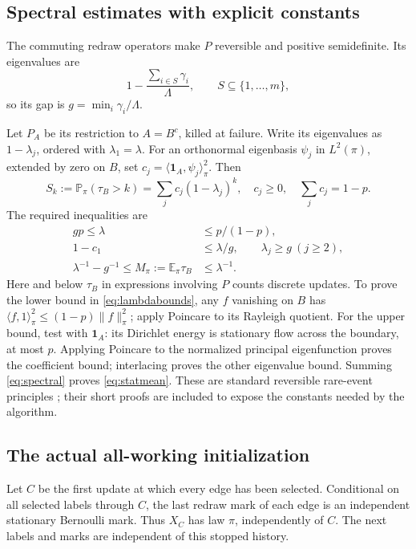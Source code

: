 \documentclass[11pt,a4paper]{article}
\newcommand{\E}{\mathbb E}
\newcommand{\Pp}{\mathbb P}
\newcommand{\one}{\mathbf 1}
\begin{document}
\subsection{Spectral estimates with explicit constants}
The commuting redraw operators make $P$ reversible and positive semidefinite. Its eigenvalues are
\[
 1-\frac{\sum_{i\in S}\gamma_i}{\Lambda},\qquad S\subseteq\{1,\ldots,m\},
\]
so its gap is $g=\min_i\gamma_i/\Lambda$.

Let $P_A$ be its restriction to $A=B^c$, killed at failure. Write its eigenvalues as $1-\lambda_j$, ordered with $\lambda_1=\lambda$. For an orthonormal eigenbasis $\psi_j$ in $L^2(\pi)$, extended by zero on $B$, set $c_j=\langle\one_A,\psi_j\rangle_\pi^2$. Then
\begin{equation}
 S_k:=\Pp_\pi(\tau_B>k)=\sum_jc_j(1-\lambda_j)^k,
 \quad c_j\ge0,\quad \sum_jc_j=1-p.\label{eq:spectral}
\end{equation}
The required inequalities are
\begin{align}
 gp\le\lambda&\le p/(1-p),\label{eq:lambdabounds}\\
 1-c_1&\le\lambda/g,\qquad \lambda_j\ge g\ (j\ge2),\label{eq:weights}\\
 \lambda^{-1}-g^{-1}\le M_\pi:=\E_\pi\tau_B&\le\lambda^{-1}.\label{eq:statmean}
\end{align}
Here and below $\tau_B$ in expressions involving $P$ counts discrete updates. To prove the lower bound in \eqref{eq:lambdabounds}, any $f$ vanishing on $B$ has $\langle f,1\rangle_\pi^2\le(1-p)\|f\|_\pi^2$; apply Poincare to its Rayleigh quotient. For the upper bound, test with $\one_A$: its Dirichlet energy is stationary flow across the boundary, at most $p$. Applying Poincare to the normalized principal eigenfunction proves the coefficient bound; interlacing proves the other eigenvalue bound. Summing \eqref{eq:spectral} proves \eqref{eq:statmean}. These are standard reversible rare-event principles \cite{aldous}; their short proofs are included to expose the constants needed by the algorithm.

\subsection{The actual all-working initialization}
Let $C$ be the first update at which every edge has been selected. Conditional on all selected labels through $C$, the last redraw mark of each edge is an independent stationary Bernoulli mark. Thus $X_C$ has law $\pi$, independently of $C$. The next labels and marks are independent of this stopped history.
\end{document}
